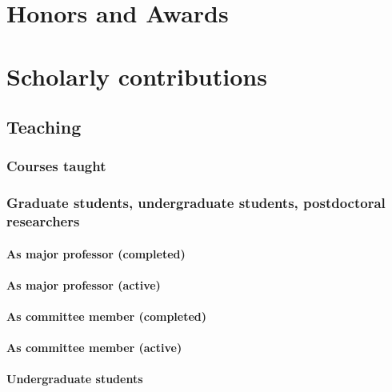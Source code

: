 \section{Honors and Awards}



\section{Scholarly contributions}

\subsection{Teaching}

\subsubsection{Courses taught}


\subsubsection{Graduate students, undergraduate students, postdoctoral researchers}

\paragraph{As major professor (completed)}



\paragraph{As major professor (active)}



\paragraph{As committee member (completed)}



\paragraph{As committee member (active)}



\paragraph{Undergraduate students}

